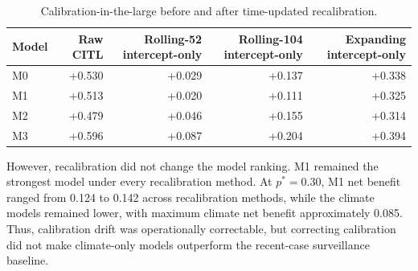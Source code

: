 \documentclass[11pt,a4paper]{article}
\begin{document}
\begin{table}[htbp]
\centering
\caption{Calibration-in-the-large before and after time-updated recalibration.}
\label{tab:rolling-recalibration-citl}
\small
\begin{tabular}{lrrrr}
\toprule
Model & Raw CITL & Rolling-52 intercept-only & Rolling-104 intercept-only & Expanding intercept-only \\
\midrule
M0 & +0.530 & +0.029 & +0.137 & +0.338 \\
M1 & +0.513 & +0.020 & +0.111 & +0.325 \\
M2 & +0.479 & +0.046 & +0.155 & +0.314 \\
M3 & +0.596 & +0.087 & +0.204 & +0.394 \\
\bottomrule
\end{tabular}
\end{table}

However, recalibration did not change the model ranking. M1 remained the strongest model under every recalibration method. At $p^*=0.30$, M1 net benefit ranged from 0.124 to 0.142 across recalibration methods, while the climate models remained lower, with maximum climate net benefit approximately 0.085. Thus, calibration drift was operationally correctable, but correcting calibration did not make climate-only models outperform the recent-case surveillance baseline.

\end{document}
